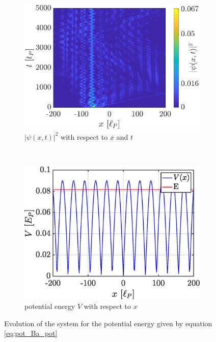\documentclass[a4paper,12pt,twoside]{article}
\begin{document}
      \begin{figure}[h]
        \centering
        \begin{subfigure}[t]{0.45\textwidth}
          \includegraphics[width=\textwidth]{graphs/v_pot_Ba_evo.eps}
          \caption{$|\psi(x, t)|^2$ with respect to $x$ and $t$}
          \label{fig:v_pot_Ba_evo}
        \end{subfigure}
        ~
        \begin{subfigure}[t]{0.45\textwidth}
          \includegraphics[width=\textwidth]{graphs/v_pot_Ba_pot.eps}
          \caption{potential energy $V$ with respect to $x$}
          \label{fig:v_pot_Ba_pot}
        \end{subfigure}
        \caption{Evolution of the system for the potential energy given by equation \eqref{eq:pot_Ba_pot}}
        \label{fig:v_pot_Ba}
      \end{figure}
\end{document}
